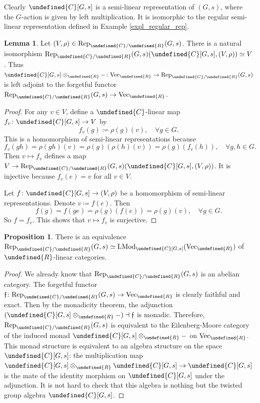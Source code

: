 \documentclass[10pt]{article}
\let\mathbb\undefined
\theoremstyle{definition}
\newtheorem{prop}[thm]{Proposition}
\newtheorem{lem}[thm]{Lemma}
\numberwithin{equation}{section}
\numberwithin{thm}{section}
\newcommand{\pf}{\begin{proof}}
\newcommand{\epf}{\end{proof}}
\newcommand{\Cb}{\mathbb{C}}
\newcommand{\Rb}{\mathbb{R}}
\DeclareMathOperator{\LMod}{LMod}
\newcommand{\forget}{\text{\usefont{U}{euf}{m}{n}f}}
\newcommand{\vect}{\mathrm{Vec}}
\newcommand{\rep}{\mathrm{Rep}}
\begin{document}
Clearly $\Cb[G,s]$ is a semi-linear representation of $(G,s)$, where the $G$-action is given by left multiplication. It is isomorphic to the regular semi-linear representation defined in Example \ref{expl_regular_rep}.

\begin{lem}
Let $(V,\rho) \in \rep_{\Cb/\Rb}(G,s)$. There is a natural isomorphism $\rep_{\Cb/\Rb}(G,s)(\Cb[G,s],(V,\rho)) \simeq V$. Thus $\Cb[G,s] \otimes_\Rb - \colon \vect_\Rb \to \rep_{\Cb/\Rb}(G,s)$ is left adjoint to the forgetful functor $\rep_{\Cb/\Rb}(G,s) \to \vect_\Rb$.
\end{lem}

\pf
For any $v \in V$, define a $\Cb$-linear map $f_v \colon \Cb[G,s] \to V$ by
\[
f_v(g) \coloneqq \rho(g)(v) , \quad \forall g \in G .
\]
This is a homomorphism of semi-linear representations because
\[
f_v(gh) = \rho(gh)(v) = \rho(g)(\rho(h)(v)) = \rho(g)(f_v(h)) , \quad \forall g,h \in G .
\]
Then $v \mapsto f_v$ defines a map $V \to \rep_{\Cb/\Rb}(G,s)(\Cb[G,s],(V,\rho))$. It is injective because $f_v(e) = v$ for all $v \in V$. 

Let $f \colon \Cb[G,s] \to (V,\rho)$ be a homomorphism of semi-linear representations. Denote $v \coloneqq f(e)$. Then
\[
f(g) = f(ge) = \rho(g)(f(e)) = \rho(g)(v) , \quad \forall g \in G .
\]
So $f = f_v$. This shows that $v \mapsto f_v$ is surjective.
\epf

\begin{prop} \label{prop_time-reversal_rep_twisted_group_algebra}
There is an equivalence $\rep_{\Cb/\Rb}(G,s) \simeq \LMod_{\Cb[G,s]}(\vect_\Rb)$ of $\Rb$-linear categories.
\end{prop}

\pf
We already know that $\rep_{\Cb/\Rb}(G,s)$ is an abelian category. The forgetful functor $\forget \colon \rep_{\Cb/\Rb}(G,s) \to \vect_\Rb$ is clearly faithful and exact. Then by the monadicity theorem, the adjunction $(\Cb[G,s] \otimes_\Rb -) \dashv \forget$ is monadic. Therefore, $\rep_{\Cb/\Rb}(G,s)$ is equivalent to the Eilenberg-Moore category of the induced monad $\Cb[G,s] \otimes_\Rb -$ on $\vect_\Rb$. This monad structure is equivalent to an algebra structure on the space $\Cb[G,s]$: the multiplication map $\Cb[G,s] \otimes_\Rb \Cb[G,s] \to \Cb[G,s]$ is the mate of the identity morphism on $\Cb[G,s]$ under the adjunction. It is not hard to check that this algebra is nothing but the twisted group algebra $\Cb[G,s]$. %
\epf
\end{document}
